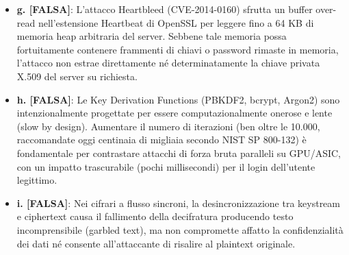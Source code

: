 \documentclass[11pt,a4paper]{article}
\begin{document}
\begin{solutionbox}
\begin{itemize}
    \item \textbf{g. [FALSA]}: L'attacco Heartbleed (CVE-2014-0160) sfrutta un buffer over-read nell'estensione Heartbeat di OpenSSL per leggere fino a 64 KB di memoria heap arbitraria del server. Sebbene tale memoria possa fortuitamente contenere frammenti di chiavi o password rimaste in memoria, l'attacco non estrae direttamente né determinatamente la chiave privata X.509 del server su richiesta.
    \item \textbf{h. [FALSA]}: Le Key Derivation Functions (PBKDF2, bcrypt, Argon2) sono intenzionalmente progettate per essere computazionalmente onerose e lente (slow by design). Aumentare il numero di iterazioni (ben oltre le 10.000, raccomandate oggi centinaia di migliaia secondo NIST SP 800-132) è fondamentale per contrastare attacchi di forza bruta paralleli su GPU/ASIC, con un impatto trascurabile (pochi millisecondi) per il login dell'utente legittimo.
    \item \textbf{i. [FALSA]}: Nei cifrari a flusso sincroni, la desincronizzazione tra keystream e ciphertext causa il fallimento della decifratura producendo testo incomprensibile (garbled text), ma non compromette affatto la confidenzialità dei dati né consente all'attaccante di risalire al plaintext originale.
\end{itemize}


\end{solutionbox}
\end{document}
